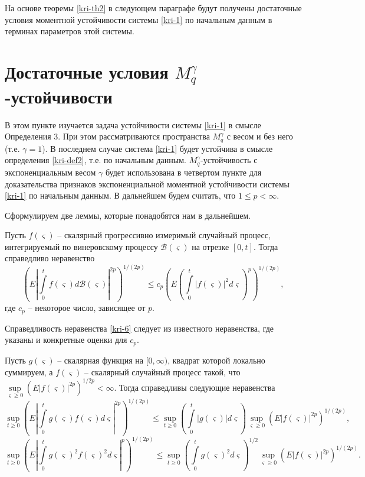 На основе теоремы \ref{kri-th2} в следующем параграфе будут получены достаточные
условия моментной устойчивости системы \eqref{kri-1} по начальным данным в
терминах параметров этой системы.

\section{Достаточные условия $M_q^\gamma$-устойчивости}\label{kri-s3} В этом
пункте изучается задача устойчивости системы \eqref{kri-1} в смысле
Определения 3. При этом рассматриваются пространства  $M_q^\gamma$ с
весом и без него (т.е. $\gamma=1$). В последнем случае система \eqref{kri-1}
будет устойчива в смысле определения \ref{kri-def2}, т.е. по начальным данным.
$M_q^\gamma$-устойчивость с экспоненциальным весом $\gamma$ будет
использована в четвертом пункте для доказательства признаков
экспоненциальной моментной устойчивости системы \eqref{kri-1} по начальным
данным. В дальнейшем будем считать, что $1 \leq p < \infty $.

Сформулируем две леммы, которые понадобятся нам в дальнейшем.

\begin{lemma}\label{kri-lem2} Пусть $f(\varsigma )$ -- скалярный прогрессивно
измеримый  случайный процесс, интегрируемый по винеровскому процессу
$\mathcal B(\varsigma)$ на отрезке $[0, t]$. Тогда справедливо
неравенство
\begin{equation}\label{kri-6}
\left (E\left |\int \limits _0^tf(\varsigma )d\mathcal B(\varsigma
)\right |^{2p}\right )^{1/(2p)} \leq c_p \left (E\left (\int \limits
_0^t|f(\varsigma )|^2d\varsigma\right )^p\right )^{1/(2p)},
\end{equation}
где $c_p$ -- некоторое число, зависящее от $p$.
\end{lemma}

Справедливость неравенства \eqref{kri-6} следует из известного неравенства,
где указаны и конкретные оценки для $c_p$.

\begin{lemma}\label{kri-lem3} Пусть $g(\varsigma)$ -- скалярная функция на $[0,
\infty)$, квадрат которой локально суммируем, а $f(\varsigma)$ --
скалярный случайный процесс такой, что $\sup \limits _{\varsigma
\geq 0}(E|f(\varsigma )|^{2p})^{1/2p} < \infty$. Тогда справедливы
следующие неравенства
\begin{equation}\label{kri-7}
\sup \limits _{t \geq 0}\left(E\left|\int \limits
_0^tg(\varsigma)f(\varsigma)d\varsigma\right|^{2p}\right)^{1/(2p)}
\leq \sup \limits _{t \geq 0}\left (\int \limits
_0^t|g(\varsigma)|d\varsigma\right )\sup \limits _{\varsigma \geq
0}\left (E\left |f(\varsigma)\right |^{2p}\right )^{1/(2p)},
\end{equation}
\begin{equation}\label{kri-8}
\sup \limits _{t \geq 0}\left(E|\int \limits
_0^tg(\varsigma)^2f(\varsigma)^2d\varsigma|^{p}\right)^{1/(2p)} \leq
\sup \limits _{t \geq 0}\left (\int \limits
_0^tg(\varsigma)^2d\varsigma\right)^{1/2}\sup \limits _{\varsigma
\geq 0}\left (E\left |f(\varsigma)\right |^{2p}\right )^{1/(2p)}.
\end{equation}
\end{lemma}

